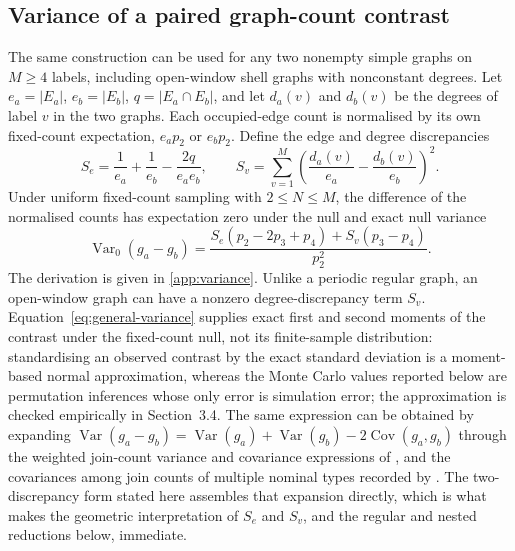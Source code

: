 \documentclass[final,1p,times,authoryear]{elsarticle}
\theoremstyle{definition}
\begin{document}
\subsection{Variance of a paired graph-count contrast}

The same construction can be used for any two nonempty simple graphs on
$M\ge4$ labels, including open-window shell graphs with nonconstant degrees.
Let $e_a=|E_a|$, $e_b=|E_b|$, $q=|E_a\cap E_b|$, and let $d_a(v)$ and
$d_b(v)$ be the degrees of label $v$ in the two graphs. Each occupied-edge
count is normalised by its own fixed-count expectation, $e_ap_2$ or $e_bp_2$.
Define the edge and degree discrepancies
\begin{equation}
S_e=\frac{1}{e_a}+\frac{1}{e_b}-\frac{2q}{e_ae_b},\qquad
S_v=\sum_{v=1}^{M}\left(\frac{d_a(v)}{e_a}-\frac{d_b(v)}{e_b}\right)^2.
\label{eq:graph-discrepancies}
\end{equation}
Under uniform fixed-count sampling with $2\le N\le M$, the difference of the
normalised counts has expectation zero under the null and exact null variance
\begin{equation}
\operatorname{Var}_0(g_a-g_b)=
\frac{S_e(p_2-2p_3+p_4)+S_v(p_3-p_4)}{p_2^2}.
\label{eq:general-variance}
\end{equation}
The derivation is given in \ref{app:variance}. Unlike a periodic
regular graph, an open-window graph can have a nonzero degree-discrepancy
term $S_v$. Equation~\eqref{eq:general-variance} supplies exact first and
second moments of the contrast under the fixed-count null, not its
finite-sample distribution: standardising an observed contrast by the exact
standard deviation is a moment-based normal approximation, whereas the Monte
Carlo values reported below are permutation inferences whose only error is
simulation error; the approximation is checked empirically in Section~3.4.
The same expression can be obtained by expanding
$\operatorname{Var}(g_a-g_b)=\operatorname{Var}(g_a)+\operatorname{Var}(g_b)-2\operatorname{Cov}(g_a,g_b)$
through the weighted join-count variance and covariance expressions of
\citet{CLIFF-ORD-1981}, and the covariances among join counts of multiple
nominal types recorded by \citet{EPPERSON-2003}. The two-discrepancy form stated
here assembles that expansion directly, which is what makes the geometric
interpretation of $S_e$ and $S_v$, and the regular and nested reductions
below, immediate.
\end{document}
